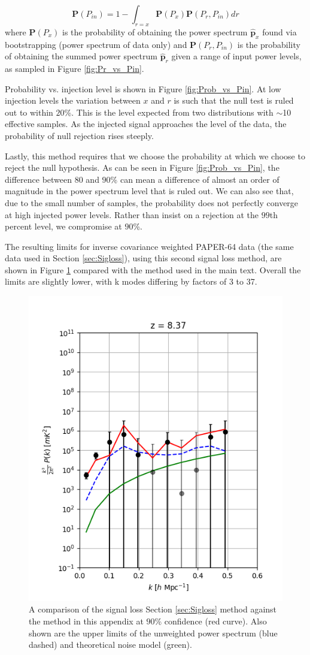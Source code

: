 \documentclass[preprint2,numberedappendix,tighten]{aastex6}  %
\newcommand{\dcj}[1]{{\color{orange} \textbf{[DCJ: #1]}}}
\newcommand{\Prob}{\mathbf{P}}
\begin{document}
 \begin{equation}
\Prob(P_{in})  =  1 -  \int_{r=x} \Prob(P_x) \Prob(P_r,P_{in}) dr
 \end{equation}
 where $\Prob(P_x)$ is the probability of obtaining the power spectrum $\hat{\textbf{p}}_x$ found via bootstrapping (power spectrum of data only) and $\Prob(P_r,P_{in})$ is the probability of obtaining the summed power spectrum $\hat{\textbf{p}}_{r}$ given a range of input power levels, as sampled in Figure \ref{fig:Pr_vs_Pin}.  
 
Probability vs. injection level is shown in Figure \ref{fig:Prob_vs_Pin}. At low injection levels the variation between $x$ and $r$ is such that the null test is ruled out to within $20$\%. This is the level expected from two distributions with $\sim$10 effective samples. 
As the injected signal approaches the level of the data, the probability of null rejection rises steeply.
  
Lastly, this method requires that we choose the probability at which we choose to reject the null hypothesis. As can be seen in Figure \ref{fig:Prob_vs_Pin}, the difference between $80$ and $90$\% can mean a difference of almost an order of magnitude in the power spectrum level that is ruled out. We can also see that, due to the small number of samples, the probability does not perfectly converge at high injected power levels. Rather than insist on a rejection at the $99$th percent level, we compromise at $90$\%.

The resulting limits for inverse covariance weighted PAPER-64 data (the same data used in Section \ref{sec:Sigloss}), using this second signal loss method, are shown in Figure \ref{fig:sigloss_compare} compared with the method used in the main text. Overall the limits are slightly lower, with k modes differing by factors of 3 to 37.  

\begin{figure}[t]
\centering
\includegraphics[width=.4\textwidth]{plots/sigloss_method_comparison.png}
\caption{A comparison of the signal loss Section \ref{sec:Sigloss} method
against the method in this appendix at $90$\% confidence (red curve).
Also shown are the upper limits of the unweighted power spectrum
(blue dashed) and theoretical noise model (green). \label{fig:sigloss_compare} }
\end{figure}



\end{document}
